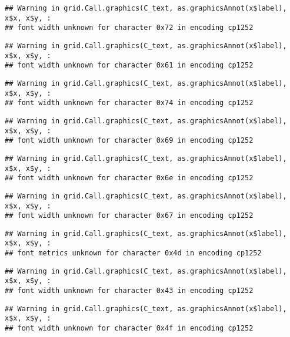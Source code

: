 \documentclass[
]{article}
\begin{document}
\begin{verbatim}
## Warning in grid.Call.graphics(C_text, as.graphicsAnnot(x$label), x$x, x$y, :
## font width unknown for character 0x72 in encoding cp1252
\end{verbatim}

\begin{verbatim}
## Warning in grid.Call.graphics(C_text, as.graphicsAnnot(x$label), x$x, x$y, :
## font width unknown for character 0x61 in encoding cp1252
\end{verbatim}

\begin{verbatim}
## Warning in grid.Call.graphics(C_text, as.graphicsAnnot(x$label), x$x, x$y, :
## font width unknown for character 0x74 in encoding cp1252
\end{verbatim}

\begin{verbatim}
## Warning in grid.Call.graphics(C_text, as.graphicsAnnot(x$label), x$x, x$y, :
## font width unknown for character 0x69 in encoding cp1252
\end{verbatim}

\begin{verbatim}
## Warning in grid.Call.graphics(C_text, as.graphicsAnnot(x$label), x$x, x$y, :
## font width unknown for character 0x6e in encoding cp1252
\end{verbatim}

\begin{verbatim}
## Warning in grid.Call.graphics(C_text, as.graphicsAnnot(x$label), x$x, x$y, :
## font width unknown for character 0x67 in encoding cp1252
\end{verbatim}

\begin{verbatim}
## Warning in grid.Call.graphics(C_text, as.graphicsAnnot(x$label), x$x, x$y, :
## font metrics unknown for character 0x4d in encoding cp1252
\end{verbatim}

\begin{verbatim}
## Warning in grid.Call.graphics(C_text, as.graphicsAnnot(x$label), x$x, x$y, :
## font width unknown for character 0x43 in encoding cp1252
\end{verbatim}

\begin{verbatim}
## Warning in grid.Call.graphics(C_text, as.graphicsAnnot(x$label), x$x, x$y, :
## font width unknown for character 0x4f in encoding cp1252
\end{verbatim}
\end{document}
